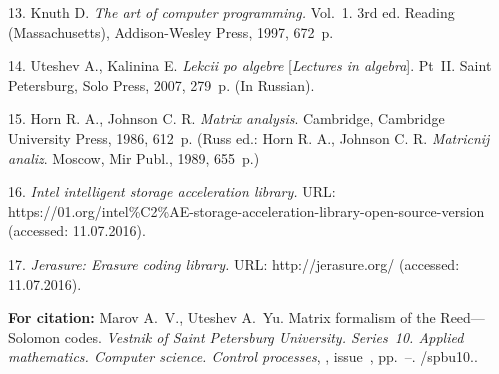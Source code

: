 {13. Knuth D. \emph{The art of computer  programming.} Vol.~1. 3rd
ed. Reading (Massachusetts), Addison-Wesley Press, 1997, 672~p.


14. Uteshev A., Kalinina E. \emph{Lekcii po algebre}
[\emph{Lectures in algebra}]. Pt~II.  Saint Petersburg, Solo
Press, 2007,  279~p. (In Russian).

15. Horn R. A., Johnson C. R. \emph{Matrix analysis}. Cambridge,
Cambridge University Press, 1986, 612~p. (Russ ed.: Horn R. A.,
Johnson C. R. {\it Matricnij analiz}. Moscow, Mir Publ., 1989,
655~p.)

16. \emph{Intel intelligent storage acceleration library.} URL:
https://01.org/intel\%C2\%AE-storage-acceleration-library-open-source-version
(accessed: 11.07.2016).

17. \emph{Jerasure: Erasure coding library.} URL:
http://jerasure.org/ (accessed: 11.07.2016).

\vskip 2mm

{\bf For citation:} Marov A.~V., Uteshev A.~Yu. Matrix formalism
of the Reed---Solomon codes. {\it Vestnik of Saint Petersburg
University. Series~10. Applied mathematics. Computer science.
Control processes}, \issueyear, issue~\issuenum,
pp.~\pageref{p1}--\pageref{p1e}.
\doivyp/spbu10.\issueyear.


}
